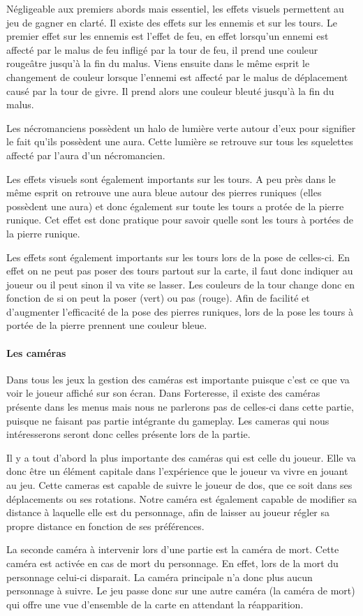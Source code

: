 \documentclass[a4paper, 12pt]{article}
\begin{document}
			Négligeable aux premiers abords mais essentiel, les effets visuels permettent au jeu de gagner en clarté. Il existe des effets sur les ennemis et sur les tours. 
Le premier effet sur les ennemis est l’effet de feu, en effet lorsqu’un ennemi est affecté par le malus de feu infligé par la tour de feu, il prend une couleur rougeâtre jusqu’à la fin du malus.
Viens ensuite dans le même esprit le changement de couleur lorsque l’ennemi est affecté par le malus de déplacement causé par la tour de givre. Il prend alors une couleur bleuté jusqu’à la fin du malus.
\par Les nécromanciens possèdent un halo de lumière verte autour d’eux pour signifier le fait qu’ils possèdent une aura. Cette lumière se retrouve sur tous les squelettes affecté par l’aura d’un nécromancien. 
\par Les effets visuels sont également importants sur les tours. A peu près dans le même esprit on retrouve une aura bleue autour des pierres runiques (elles possèdent une aura) et donc également sur toute les tours a protée de la pierre runique. Cet effet est donc pratique pour savoir quelle sont les tours à portées de la pierre runique.
\par Les effets sont également importants sur les tours lors de la pose de celles-ci. En effet on ne peut pas poser des tours partout sur la carte, il faut donc indiquer au joueur ou il peut sinon il va vite se lasser. Les couleurs de la tour change donc en fonction de si on peut la poser (vert) ou pas (rouge). Afin de facilité et d’augmenter l’efficacité de la pose des pierres runiques, lors de la pose les tours à portée de la pierre prennent une couleur bleue.

			\paragraph{Les caméras}
			
			Dans tous les jeux la gestion des caméras est importante puisque c’est ce que va voir le joueur affiché sur son écran. Dans Forteresse, il existe des caméras présente dans les menus mais nous ne parlerons pas de celles-ci dans cette partie, puisque ne faisant pas partie intégrante du gameplay. Les cameras qui nous intéresserons seront donc celles présente lors de la partie.
\par Il y a tout d’abord la plus importante des caméras qui est celle du joueur. Elle va donc être un élément capitale dans l’expérience que le joueur va vivre en jouant au jeu. Cette cameras est capable de suivre le joueur de dos, que ce soit dans ses déplacements ou ses rotations. Notre caméra est également capable de modifier sa distance à laquelle elle est du personnage, afin de laisser au joueur régler sa propre distance en fonction de ses préférences. 
\par La seconde caméra à intervenir lors d’une partie est la caméra de mort. Cette caméra est activée en cas de mort du personnage. En effet, lors de la mort du personnage celui-ci disparait. La caméra principale n’a donc plus aucun personnage à suivre. Le jeu passe donc sur une autre caméra (la caméra de mort) qui offre une vue d’ensemble de la carte en attendant la réapparition.
\end{document}
